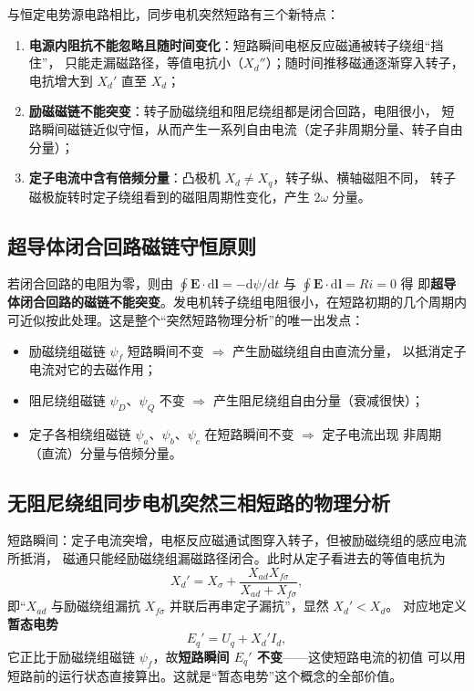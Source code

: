 与恒定电势源电路相比，同步电机突然短路有三个新特点：
\begin{enumerate}
  \item \textbf{电源内阻抗不能忽略且随时间变化}：短路瞬间电枢反应磁通被转子绕组“挡住”，
        只能走漏磁路径，等值电抗小（$X_d''$）；随时间推移磁通逐渐穿入转子，
        电抗增大到 $X_d'$ 直至 $X_d$；
  \item \textbf{励磁磁链不能突变}：转子励磁绕组和阻尼绕组都是闭合回路，电阻很小，
        短路瞬间磁链近似守恒，从而产生一系列自由电流（定子非周期分量、转子自由分量）；
  \item \textbf{定子电流中含有倍频分量}：凸极机 $X_d\ne X_q$，转子纵、横轴磁阻不同，
        转子磁极旋转时定子绕组看到的磁阻周期性变化，产生 $2\omega$ 分量。
\end{enumerate}

\subsection{超导体闭合回路磁链守恒原则}

若闭合回路的电阻为零，则由 $\oint\boldsymbol E\cdot\mathrm{d}\boldsymbol l=-\mathrm{d}\psi/\mathrm{d}t$
与 $\oint\boldsymbol E\cdot\mathrm{d}\boldsymbol l=Ri=0$ 得
即\textbf{超导体闭合回路的磁链不能突变}。发电机转子绕组电阻很小，在短路初期的几个周期内
可近似按此处理。这是整个“突然短路物理分析”的唯一出发点：
\begin{itemize}
  \item 励磁绕组磁链 $\psi_f$ 短路瞬间不变 $\Rightarrow$ 产生励磁绕组自由直流分量，
        以抵消定子电流对它的去磁作用；
  \item 阻尼绕组磁链 $\psi_D$、$\psi_Q$ 不变 $\Rightarrow$ 产生阻尼绕组自由分量（衰减很快）；
  \item 定子各相绕组磁链 $\psi_a$、$\psi_b$、$\psi_c$ 在短路瞬间不变 $\Rightarrow$ 定子电流出现
        非周期（直流）分量与倍频分量。
\end{itemize}

\subsection{无阻尼绕组同步电机突然三相短路的物理分析}

短路瞬间：定子电流突增，电枢反应磁通试图穿入转子，但被励磁绕组的感应电流所抵消，
磁通只能经励磁绕组漏磁路径闭合。此时从定子看进去的等值电抗为
\begin{equation}
  X_d'=X_\sigma+\frac{X_{ad}X_{f\sigma}}{X_{ad}+X_{f\sigma}},
\end{equation}
即“$X_{ad}$ 与励磁绕组漏抗 $X_{f\sigma}$ 并联后再串定子漏抗”，显然 $X_d'<X_d$。
对应地定义\textbf{暂态电势}
\begin{equation}
  E_q'=U_q+X_d'I_d ,
\end{equation}
它正比于励磁绕组磁链 $\psi_f$，故\textbf{短路瞬间 $E_q'$ 不变}——这使短路电流的初值
可以用短路前的运行状态直接算出。这就是“暂态电势”这个概念的全部价值。

